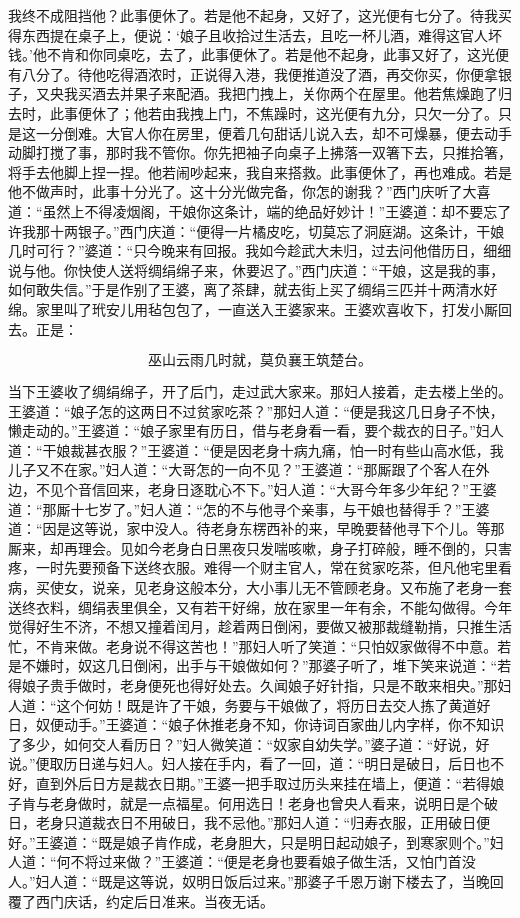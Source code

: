 我终不成阻挡他？此事便休了。若是他不起身，又好了，这光便有七分了。待我买得东西提在桌子上，便说：‘娘子且收拾过生活去，且吃一杯儿酒，难得这官人坏钱。’他不肯和你同桌吃，去了，此事便休了。若是他不起身，此事又好了，这光便有八分了。待他吃得酒浓时，正说得入港，我便推道没了酒，再交你买，你便拿银子，又央我买酒去并果子来配酒。我把门拽上，关你两个在屋里。他若焦燥跑了归去时，此事便休了；他若由我拽上门，不焦躁时，这光便有九分，只欠一分了。只是这一分倒难。大官人你在房里，便着几句甜话儿说入去，却不可燥暴，便去动手动脚打搅了事，那时我不管你。你先把袖子向桌子上拂落一双箸下去，只推拾箸，将手去他脚上捏一捏。他若闹吵起来，我自来搭救。此事便休了，再也难成。若是他不做声时，此事十分光了。这十分光做完备，你怎的谢我？”西门庆听了大喜道：“虽然上不得凌烟阁，干娘你这条计，端的绝品好妙计！”王婆道：却不要忘了许我那十两银子。”西门庆道：“便得一片橘皮吃，切莫忘了洞庭湖。这条计，干娘几时可行？”婆道：“只今晚来有回报。我如今趁武大未归，过去问他借历日，细细说与他。你快使人送将绸绢绵子来，休要迟了。”西门庆道：“干娘，这是我的事，如何敢失信。”于是作别了王婆，离了茶肆，就去街上买了绸绢三匹并十两清水好绵。家里叫了玳安儿用毡包包了，一直送入王婆家来。王婆欢喜收下，打发小厮回去。正是：

\[
巫山云雨几时就，莫负襄王筑楚台。
\]

当下王婆收了绸绢绵子，开了后门，走过武大家来。那妇人接着，走去楼上坐的。王婆道：“娘子怎的这两日不过贫家吃茶？”那妇人道：“便是我这几日身子不快，懒走动的。”王婆道：“娘子家里有历日，借与老身看一看，要个裁衣的日子。”妇人道：“干娘裁甚衣服？”王婆道：“便是因老身十病九痛，怕一时有些山高水低，我儿子又不在家。”妇人道：“大哥怎的一向不见？”王婆道：“那厮跟了个客人在外边，不见个音信回来，老身日逐耽心不下。”妇人道：“大哥今年多少年纪？”王婆道：“那厮十七岁了。”妇人道：“怎的不与他寻个亲事，与干娘也替得手？”王婆道：“因是这等说，家中没人。待老身东楞西补的来，早晚要替他寻下个儿。等那厮来，却再理会。见如今老身白日黑夜只发喘咳嗽，身子打碎般，睡不倒的，只害疼，一时先要预备下送终衣服。难得一个财主官人，常在贫家吃茶，但凡他宅里看病，买使女，说亲，见老身这般本分，大小事儿无不管顾老身。又布施了老身一套送终衣料，绸绢表里俱全，又有若干好绵，放在家里一年有余，不能勾做得。今年觉得好生不济，不想又撞着闰月，趁着两日倒闲，要做又被那裁缝勒掯，只推生活忙，不肯来做。老身说不得这苦也！”那妇人听了笑道：“只怕奴家做得不中意。若是不嫌时，奴这几日倒闲，出手与干娘做如何？”那婆子听了，堆下笑来说道：“若得娘子贵手做时，老身便死也得好处去。久闻娘子好针指，只是不敢来相央。”那妇人道：“这个何妨！既是许了干娘，务要与干娘做了，将历日去交人拣了黄道好日，奴便动手。”王婆道：“娘子休推老身不知，你诗词百家曲儿内字样，你不知识了多少，如何交人看历日？”妇人微笑道：“奴家自幼失学。”婆子道：“好说，好说。”便取历日递与妇人。妇人接在手内，看了一回，道：“明日是破日，后日也不好，直到外后日方是裁衣日期。”王婆一把手取过历头来挂在墙上，便道：“若得娘子肯与老身做时，就是一点福星。何用选日！老身也曾央人看来，说明日是个破日，老身只道裁衣日不用破日，我不忌他。”那妇人道：“归寿衣服，正用破日便好。”王婆道：“既是娘子肯作成，老身胆大，只是明日起动娘子，到寒家则个。”妇人道：“何不将过来做？”王婆道：“便是老身也要看娘子做生活，又怕门首没人。”妇人道：“既是这等说，奴明日饭后过来。”那婆子千恩万谢下楼去了，当晚回覆了西门庆话，约定后日准来。当夜无话。

